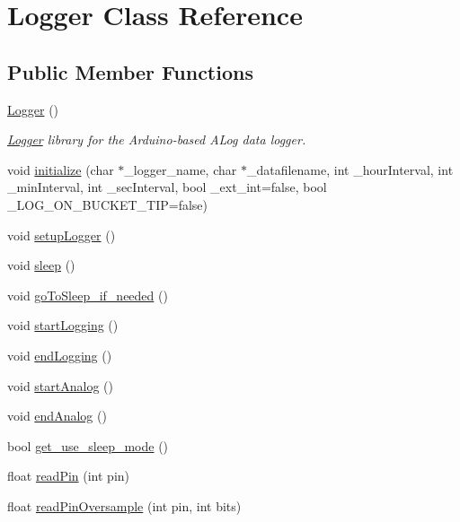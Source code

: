 \hypertarget{classLogger}{}\section{Logger Class Reference}
\label{classLogger}
\subsection*{Public Member Functions}
\begin{DoxyCompactItemize}
\item 
\hyperlink{classLogger_abc41bfb031d896170c7675fa96a6b30c}{Logger} ()
\begin{DoxyCompactList}\small\item\em \hyperlink{classLogger}{Logger} library for the Arduino-\/based A\+Log data logger. \end{DoxyCompactList}\item 
void \hyperlink{classLogger_a635c5dc0046646bec7023ef7133f0eb3}{initialize} (char $\ast$\+\_\+logger\+\_\+name, char $\ast$\+\_\+datafilename, int \+\_\+hour\+Interval, int \+\_\+min\+Interval, int \+\_\+sec\+Interval, bool \+\_\+ext\+\_\+int=false, bool \+\_\+\+L\+O\+G\+\_\+\+O\+N\+\_\+\+B\+U\+C\+K\+E\+T\+\_\+\+T\+IP=false)
\item 
void \hyperlink{classLogger_ab5e0bd543758c65a17b77553a0e9f0c9}{setup\+Logger} ()
\item 
void \hyperlink{classLogger_ad90ff8f29410f6b70cc6334391400a4e}{sleep} ()
\item 
void \hyperlink{classLogger_ad28cf6450ada04f0e1475998bede5b88}{go\+To\+Sleep\+\_\+if\+\_\+needed} ()
\item 
void \hyperlink{classLogger_a4a6c78dd1715b33ae4bbd6f66f116f77}{start\+Logging} ()
\item 
void \hyperlink{classLogger_aa82814d61687debcf3b8dd6f46c9d549}{end\+Logging} ()
\item 
void \hyperlink{classLogger_af936c7f58e23316abb5614cbd31c7ced}{start\+Analog} ()
\item 
void \hyperlink{classLogger_adca7be8a63592263c67f63766680d16f}{end\+Analog} ()
\item 
bool \hyperlink{classLogger_acc758b6fdaac8099c492929aa7f1691d}{get\+\_\+use\+\_\+sleep\+\_\+mode} ()
\item 
float \hyperlink{classLogger_a343fcabefb37e06429865a2e6a6e708a}{read\+Pin} (int pin)
\item 
float \hyperlink{classLogger_a4e67526c65fa865f276a515a200af4aa}{read\+Pin\+Oversample} (int pin, int bits)

\end{DoxyCompactItemize}
